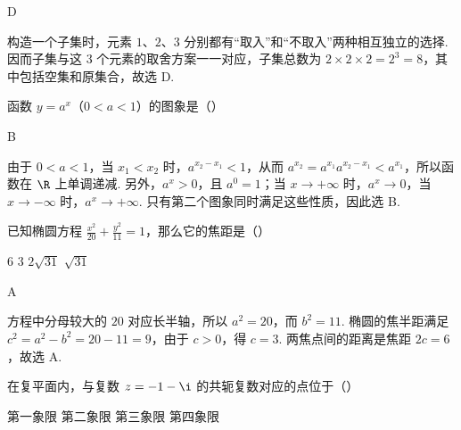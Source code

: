 \begin{answer}
D
\end{answer}

\begin{solution}
构造一个子集时，元素 \(1\)、\(2\)、\(3\) 分别都有“取入”和“不取入”两种相互独立的选择. 因而子集与这 \(3\) 个元素的取舍方案一一对应，子集总数为 \(2\times2\times2=2^3=8\)，其中包括空集和原集合，故选 D.
\end{solution}

\begin{problem}
函数 \(y = a^x\)（\(0 < a < 1\)）的图象是（\quad）

    {}
    {}
    {}
\end{problem}

\begin{answer}
B
\end{answer}

\begin{solution}
由于 \(0<a<1\)，当 \(x_1<x_2\) 时，\(a^{x_2-x_1}<1\)，从而
\(a^{x_2}=a^{x_1}a^{x_2-x_1}<a^{x_1}\)，所以函数在 \(\R\) 上单调递减. 另外，\(a^x>0\)，且 \(a^0=1\)；当 \(x\to+\infty\) 时，\(a^x\to0\)，当 \(x\to-\infty\) 时，\(a^x\to+\infty\). 只有第二个图象同时满足这些性质，因此选 B.
\end{solution}

\begin{problem}
已知椭圆方程 \(\frac{x^2}{20} + \frac{y^2}{11} = 1\)，那么它的焦距是（\quad）

\choices
    {\(6\)}
    {\(3\)}
    {\(2\sqrt{31}\)}
    {\(\sqrt{31}\)}
\end{problem}

\begin{answer}
A
\end{answer}

\begin{solution}
方程中分母较大的 \(20\) 对应长半轴，所以 \(a^2=20\)，而 \(b^2=11\). 椭圆的焦半距满足
\(c^2=a^2-b^2=20-11=9\)，由于 \(c>0\)，得 \(c=3\). 两焦点间的距离是焦距 \(2c=6\)，故选 A.
\end{solution}

\begin{problem}
在复平面内，与复数 \(z = -1 - \i\) 的共轭复数对应的点位于（\quad）

\choices
    {第一象限}
    {第二象限}
    {第三象限}
    {第四象限}
\end{problem}

